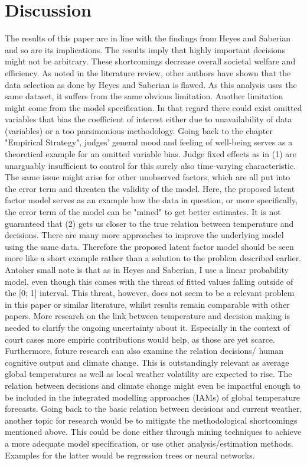 \documentclass[11pt]{article}
\begin{document}
	\section{Discussion}
	The results of this paper are in line with the findings from Heyes and Saberian and so are its implications. The results imply that highly important decisions might not be arbitrary. These shortcomings decrease overall societal welfare and efficiency.
	\newline As noted in the literature review, other authors have shown that the data selection as done by Heyes and Saberian is flawed. As this analysis uses the same dataset, it suffers from the same obvious limitation. Another limitation might come from the model specification. In that regard there could exist omitted variables that bias the coefficient of interest either due to unavailability of data (variables) or a too parsimonious methodology. Going back to the chapter "Empirical Strategy", judges' general mood and feeling of well-being serves as a theoretical example for an omitted variable bias. Judge fixed effects as in (1) are unarguably insufficient to control for this surely also time-varying characteristic. The same issue might arise for other unobserved factors, which are all put into the error term and threaten the validity of the model. Here, the proposed latent factor model serves as an example how the data in question, or more specifically, the error term of the model can be "mined" to get better estimates. It is not guaranteed that (2) gets us closer to the true relation between temperature and decisions. There are many more approaches to improve the underlying model using the same data. Therefore the proposed latent factor model should be seen more like a short example rather than a solution to the problem described earlier. Antoher small note is that as in Heyes and Saberian, I use a linear probability model, even though this comes with the threat of fitted values falling outside of the [0; 1] interval. This threat, however, does not seem to be a relevant problem in this paper or similar literature, whilst results remain comparable with other papers.
	\newline More research on the link between temperature and decision making is needed to clarify the ongoing uncertainty about it. Especially in the context of court cases more empiric contributions would help, as those are yet scarce. Furthermore, future research can also examine the relation decisions/ human cognitive output and climate change. This is outstandingly relevant as average global temperatures as well as local weather volatility are expected to rise. The relation between decisions and climate change might even be impactful enough to be included in the integrated modelling approaches (IAMs) of global temperature forecasts. Going back to the basic relation between decisions and current weather, another topic for research would be to mitigate the methodological shortcomings mentioned above. This could be done either through mining techniques to achieve a more adequate model specification, or use other analysis/estimation methods. Examples for the latter would be regression trees or neural networks.
\end{document}
